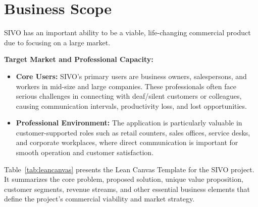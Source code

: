 \documentclass[12pt,a4paper,oneside]{report}
\begin{document}
\section{Business Scope}

SIVO has an important ability to be a viable, life-changing commercial product due to focusing on a large market.

\textbf{Target Market and Professional Capacity:}

\begin{itemize}
  \item \textbf{Core Users:} SIVO's primary users are business owners, salespersons, and workers in mid-size and large companies. These professionals often face serious challenges in connecting with deaf/silent customers or colleagues, causing communication intervals, productivity loss, and lost opportunities.
  \item \textbf{Professional Environment:} The application is particularly valuable in customer-supported roles such as retail counters, sales offices, service desks, and corporate workplaces, where direct communication is important for smooth operation and customer satisfaction.
\end{itemize}

Table~\ref{tab:leancanvas} presents the Lean Canvas Template for the SIVO project. It summarizes the core problem, proposed solution, unique value proposition, customer segments, revenue streams, and other essential business elements that define the project's commercial viability and market strategy.
\end{document}
